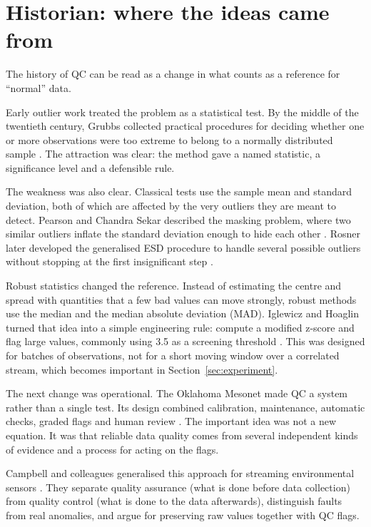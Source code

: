 \section{Historian: where the ideas came from}
\label{sec:history}

The history of QC can be read as a change in what counts as a reference for
``normal'' data.

Early outlier work treated the problem as a statistical test. By the middle
of the twentieth century, Grubbs collected practical procedures for deciding
whether one or more observations were too extreme to belong to a normally
distributed sample \citep{grubbs1969}. The attraction was clear: the method
gave a named statistic, a significance level and a defensible rule.

The weakness was also clear. Classical tests use the sample mean and standard
deviation, both of which are affected by the very outliers they are meant to
detect. Pearson and Chandra Sekar described the masking problem, where two
similar outliers inflate the standard deviation enough to hide each other
\citep{pearson1936}. Rosner later developed the generalised ESD procedure to
handle several possible outliers without stopping at the first insignificant
step \citep{rosner1983}.

Robust statistics changed the reference. Instead of estimating the centre
and spread with quantities that a few bad values can move strongly, robust
methods use the median and the median absolute deviation (MAD). Iglewicz and
Hoaglin turned that idea into a simple engineering rule: compute a modified
z-score and flag large values, commonly using 3.5 as a screening threshold
\citep{iglewicz1993}. This was designed for batches of observations, not for
a short moving window over a correlated stream, which becomes important in
Section~\ref{sec:experiment}.

The next change was operational. The Oklahoma Mesonet made QC a system rather
than a single test. Its design combined calibration, maintenance, automatic
checks, graded flags and human review \citep{shafer2000}. The important idea
was not a new equation. It was that reliable data quality comes from several
independent kinds of evidence and a process for acting on the flags.

Campbell and colleagues generalised this approach for streaming
environmental sensors \citep{campbell2013}. They separate quality assurance
(what is done before data collection) from quality control (what is done to
the data afterwards), distinguish faults from real anomalies, and argue for
preserving raw values together with QC flags.

